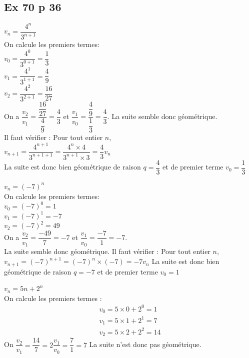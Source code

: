 \documentclass[a4paper,french]{book}
\begin{document}
\subsection*{Ex 70 p 36}
\begin{enumMet}
    \item $v_{n}=\dfrac{4^{n}}{3^{n+1}}$\\
    On calcule les premiers termes:\\
    $v_{0}=\dfrac{4^{0}}{3^{0+1}}=\dfrac{1}{3}$\\
    $v_{1}=\dfrac{4^{1}}{3^{1+1}}=\dfrac{4}{9}$\\
    $v_{2}=\dfrac{4^{2}}{3^{2+1}}=\dfrac{16}{27}$\\
    On a $\dfrac{v_{2}}{v_{1}}=\dfrac{\dfrac{16}{27}}{\dfrac{4}{9}}=\dfrac{4}{3}$ et $\dfrac{v_{1}}{v_{0}}=\dfrac{\dfrac{4}{9}}{\dfrac{1}{3}}=\dfrac{4}{3}$. La suite semble donc géométrique.\\
    Il faut vérifier : Pour tout entier $n$,\\
    $v_{n+1}=\dfrac{4^{n+1}}{3^{n+1+1}}=\dfrac{4^{n} \times 4}{3^{n+1} \times 3}=\dfrac{4}{3} v_{n}$\\
    La suite est donc bien géométrique de raison $q=\dfrac{4}{3}$ et de premier terme $v_{0}=\dfrac{1}{3}$
    \item $v_{n}=(-7)^{n}$\\
    On calcule les premiers termes:\\
    $v_{0}=(-7)^{0}=1$\\
    $v_{1}=(-7)^{1}=-7$\\
    $v_{2}=(-7)^{2}=49$\\
    On a $\dfrac{v_{2}}{v_{1}}=\dfrac{-49}{7}=-7$ et $\dfrac{v_{1}}{v_{0}}=\dfrac{-7}{1}=-7$.\\
    La suite semble donc géométrique. Il faut vérifier : Pour tout entier $n$,\\
    $v_{n+1}=(-7)^{n+1}=(-7)^{n} \times(-7)=-7 v_{n}$
    La suite est donc bien géométrique de raison $q=-7$ et de premier terme $v_{0}=1$
    \item $v_{n}=5 n+2^{n}$\\
    On calcule les premiers termes :
    $$
    \begin{array}{l}
    v_{0}=5 \times 0+2^{0}=1 \\
    v_{1}=5 \times 1+2^{1}=7 \\
    v_{2}=5 \times 2+2^{2}=14
    \end{array}
    $$
    On $\dfrac{v_{2}}{v_{1}}=\dfrac{14}{7}=2 \dfrac{v_{1}}{v_0}=\dfrac{7}{1}=7$
    La suite n'est donc pas géométrique.

\end{enumMet}
\end{document}
